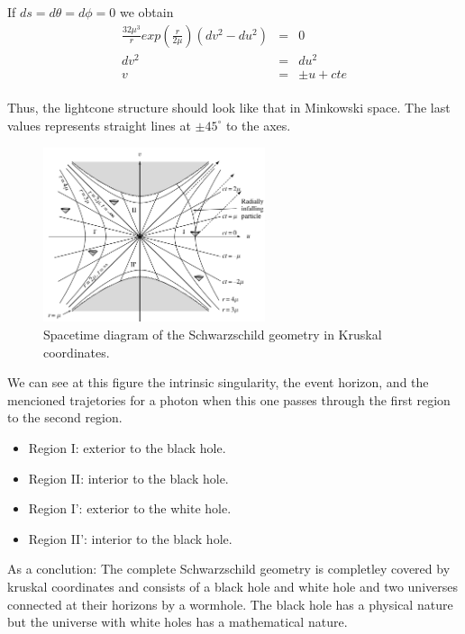 \documentclass[letterpaper,11pt,onecolumn]{article}
\begin{document}
If $ds=d\theta=d\phi=0$ we obtain 
\begin{eqnarray*}
    \frac{32\mu^3}{r}exp\left(\frac{r}{2\mu}\right)(dv^2-du^2)&=&0\\
    dv^2&=&du^2\\
    v&=&\pm u + cte
\end{eqnarray*}\\
Thus, the lightcone structure should look like that in Minkowski space. The last values represents straight lines at $\pm45^\circ$ to the axes.
\begin{figure}[h!]
    \centering
    \includegraphics[width=0.58\textwidth]{Report/Images/4bhkruskal.png}
    \caption{Spacetime diagram of the Schwarzschild geometry in Kruskal coordinates.}
\label{fig3}
\end{figure}
We can see at this figure the intrinsic singularity, the event horizon, and the mencioned trajetories for a photon when this one passes through the first region to the second region.
\begin{itemize}
    \item Region I: exterior to the black hole.
    \item Region II: interior to the black hole.
    \item Region I': exterior to the white hole.
    \item Region II': interior to the black hole.
\end{itemize}
As a conclution: The complete Schwarzschild geometry is completley covered by kruskal coordinates and consists of a black hole and white hole and two universes connected at their horizons by a
wormhole. The black hole has a physical nature but the universe with white holes has a mathematical nature.
\end{document}
